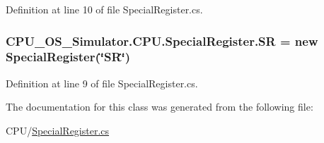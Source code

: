 Definition at line 10 of file Special\+Register.\+cs.

\hypertarget{class_c_p_u___o_s___simulator_1_1_c_p_u_1_1_special_register_a556243e1c3c891e685bf884771c1575c}{}
\subsubsection[{S\+R}]{ C\+P\+U\+\_\+\+O\+S\+\_\+\+Simulator.\+C\+P\+U.\+Special\+Register.\+S\+R = new {\bf Special\+Register}(\char`\"{}S\+R\char`\"{})\hspace{0.3cm}{\ttfamily [static]}}\label{class_c_p_u___o_s___simulator_1_1_c_p_u_1_1_special_register_a556243e1c3c891e685bf884771c1575c}


Definition at line 9 of file Special\+Register.\+cs.



The documentation for this class was generated from the following file\+:\begin{DoxyCompactItemize}
\item 
C\+P\+U/\hyperlink{_special_register_8cs}{Special\+Register.\+cs}\end{DoxyCompactItemize}
